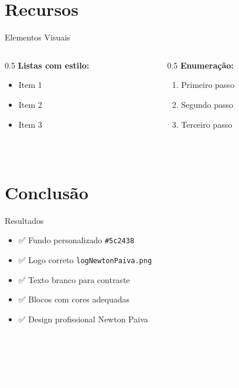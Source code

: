\documentclass{beamer}
\begin{document}
\section{Recursos}
\begin{frame}{Elementos Visuais}
    \begin{columns}
        \begin{column}{0.5\textwidth}
            \textbf{Listas com estilo:}
            \begin{itemize}
                \item Item 1
                \item Item 2
                \item Item 3
            \end{itemize}
        \end{column}
        \begin{column}{0.5\textwidth}
            \textbf{Enumeração:}
            \begin{enumerate}
                \item Primeiro passo
                \item Segundo passo
                \item Terceiro passo
            \end{enumerate}
        \end{column}
    \end{columns}
    
    \vspace{1cm}
    \begin{center}
        \textcolor{white}{\textbf{Visual profissional e moderno!}}
    \end{center}
\end{frame}

\section{Conclusão}
\begin{frame}{Resultados}
    \begin{itemize}
        \item ✅ Fundo personalizado \texttt{\#5c2438}
        \item ✅ Logo correto \texttt{logNewtonPaiva.png}
        \item ✅ Texto branco para contraste
        \item ✅ Blocos com cores adequadas
        \item ✅ Design profissional Newton Paiva
    \end{itemize}
    
    \vspace{1cm}
    \begin{center}
        \textcolor{white}{\Large\textbf{Pronto para apresentar!}}
    \end{center}
\end{frame}

\begin{frame}
    \begin{center}
        \Huge\textcolor{white}{Obrigado!}
        \vspace{0.5cm}
        
        \newtonlogo[2cm]
        
        \vspace{0.5cm}
        \Large\textcolor{white}{Perguntas?}
    \end{center}
\end{frame}
\end{document}
